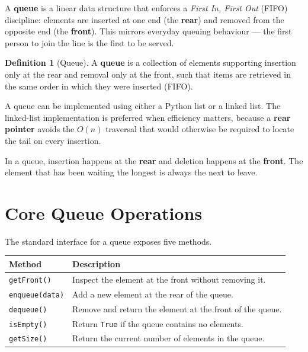 \documentclass[11pt, a4paper, notitlepage]{report}
\theoremstyle{definition}
\newtheorem{definition}[theorem]{Definition}
\theoremstyle{remark}
\theoremstyle{definition}
\begin{document}
A \textbf{queue} is a linear data structure that enforces a \emph{First In, First Out} (FIFO)
discipline: elements are inserted at one end (the \textbf{rear}) and removed from the opposite
end (the \textbf{front}).  This mirrors everyday queuing behaviour --- the first person to join
the line is the first to be served.

\begin{definition}[Queue]
\label{def:queue}
A \textbf{queue} is a collection of elements supporting insertion only at the rear and removal
only at the front, such that items are retrieved in the same order in which they were inserted
(FIFO).
\end{definition}

A queue can be implemented using either a Python list or a linked list.  The linked-list
implementation is preferred when efficiency matters, because a \textbf{rear pointer} avoids the
$O(n)$ traversal that would otherwise be required to locate the tail on every insertion.

\begin{keyresult}[title={Key Result: FIFO Discipline}]
In a queue, insertion happens at the \textbf{rear} and deletion happens at the
\textbf{front}.  The element that has been waiting the longest is always the next to leave.
\end{keyresult}


\section{Core Queue Operations}
\label{sec:queue-ops}

The standard interface for a queue exposes five methods.

\begin{center}
\begin{tabularx}{\linewidth}{@{} l X @{}}
\toprule
\textbf{Method} & \textbf{Description} \\
\midrule
\texttt{getFront()} & Inspect the element at the front without removing it. \\
\texttt{enqueue(data)} & Add a new element at the rear of the queue. \\
\texttt{dequeue()} & Remove and return the element at the front of the queue. \\
\texttt{isEmpty()} & Return \texttt{True} if the queue contains no elements. \\
\texttt{getSize()} & Return the current number of elements in the queue. \\
\bottomrule
\end{tabularx}
\end{center}
\end{document}
